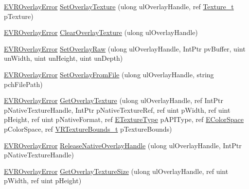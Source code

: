\begin{DoxyCompactItemize}
\item 
\mbox{\hyperlink{namespace_valve_1_1_v_r_aaee5c5144f42b7969d45b854f51b0c18}{E\+V\+R\+Overlay\+Error}} \mbox{\hyperlink{class_valve_1_1_v_r_1_1_c_v_r_overlay_ae92d75776584ef4e1f63872d2fccf5f7}{Set\+Overlay\+Texture}} (ulong ul\+Overlay\+Handle, ref \mbox{\hyperlink{struct_valve_1_1_v_r_1_1_texture__t}{Texture\+\_\+t}} p\+Texture)
\item 
\mbox{\hyperlink{namespace_valve_1_1_v_r_aaee5c5144f42b7969d45b854f51b0c18}{E\+V\+R\+Overlay\+Error}} \mbox{\hyperlink{class_valve_1_1_v_r_1_1_c_v_r_overlay_a5b5225eecf368458d61264b16342e399}{Clear\+Overlay\+Texture}} (ulong ul\+Overlay\+Handle)
\item 
\mbox{\hyperlink{namespace_valve_1_1_v_r_aaee5c5144f42b7969d45b854f51b0c18}{E\+V\+R\+Overlay\+Error}} \mbox{\hyperlink{class_valve_1_1_v_r_1_1_c_v_r_overlay_a2533abfa33181aa51663a91f73d16a6f}{Set\+Overlay\+Raw}} (ulong ul\+Overlay\+Handle, Int\+Ptr pv\+Buffer, uint un\+Width, uint un\+Height, uint un\+Depth)
\item 
\mbox{\hyperlink{namespace_valve_1_1_v_r_aaee5c5144f42b7969d45b854f51b0c18}{E\+V\+R\+Overlay\+Error}} \mbox{\hyperlink{class_valve_1_1_v_r_1_1_c_v_r_overlay_a39816b5a3dd5dbfb23ac888bd3ce0e7f}{Set\+Overlay\+From\+File}} (ulong ul\+Overlay\+Handle, string pch\+File\+Path)
\item 
\mbox{\hyperlink{namespace_valve_1_1_v_r_aaee5c5144f42b7969d45b854f51b0c18}{E\+V\+R\+Overlay\+Error}} \mbox{\hyperlink{class_valve_1_1_v_r_1_1_c_v_r_overlay_a9a45ac264cc0959968883880b3e7231b}{Get\+Overlay\+Texture}} (ulong ul\+Overlay\+Handle, ref Int\+Ptr p\+Native\+Texture\+Handle, Int\+Ptr p\+Native\+Texture\+Ref, ref uint p\+Width, ref uint p\+Height, ref uint p\+Native\+Format, ref \mbox{\hyperlink{namespace_valve_1_1_v_r_a9481de640e411eef49c2f3fdca82eaa3}{E\+Texture\+Type}} p\+A\+P\+I\+Type, ref \mbox{\hyperlink{namespace_valve_1_1_v_r_aeb0fba37ba28d8ca276d7c10f01809ac}{E\+Color\+Space}} p\+Color\+Space, ref \mbox{\hyperlink{struct_valve_1_1_v_r_1_1_v_r_texture_bounds__t}{V\+R\+Texture\+Bounds\+\_\+t}} p\+Texture\+Bounds)
\item 
\mbox{\hyperlink{namespace_valve_1_1_v_r_aaee5c5144f42b7969d45b854f51b0c18}{E\+V\+R\+Overlay\+Error}} \mbox{\hyperlink{class_valve_1_1_v_r_1_1_c_v_r_overlay_aea1b0d3f05c135c46c04dd0f68c53e5c}{Release\+Native\+Overlay\+Handle}} (ulong ul\+Overlay\+Handle, Int\+Ptr p\+Native\+Texture\+Handle)
\item 
\mbox{\hyperlink{namespace_valve_1_1_v_r_aaee5c5144f42b7969d45b854f51b0c18}{E\+V\+R\+Overlay\+Error}} \mbox{\hyperlink{class_valve_1_1_v_r_1_1_c_v_r_overlay_a408660f373e733686610b6b8815c04be}{Get\+Overlay\+Texture\+Size}} (ulong ul\+Overlay\+Handle, ref uint p\+Width, ref uint p\+Height)

\end{DoxyCompactItemize}
